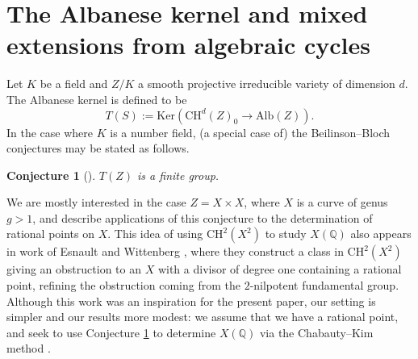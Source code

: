 \documentclass[11pt]{amsart}
\def\Q{\mathbb Q}
\theoremstyle{plain}
\newtheorem{conjecture}{Conjecture}
\theoremstyle{definition}
\newcommand{\Ker}{\mathrm{Ker}}
\newcommand{\CH}{\mathrm{CH}}
\newcommand{\Alb}{\mathrm{Alb}}
\begin{document}
\section{The Albanese kernel and mixed extensions from algebraic cycles}\label{sec:alb}
Let $K$ be a field and $Z/K$ a smooth projective irreducible variety of dimension $d$. The Albanese kernel is defined to be
\[
T(S):=\Ker (\CH^d (Z)_0 \to \Alb (Z)).
\]
In the case where $K$ is a number field, (a special case of) the Beilinson--Bloch conjectures may be stated as follows.
\begin{conjecture}[\cite{beilinson}]\label{conj:BB}
$T(Z)$ is a finite group.
\end{conjecture}

We are mostly interested in the case $Z=X\times X$, where $X$ is a curve of genus $g>1$, and describe applications of this conjecture to the determination of rational points on $X$. This idea of using $\CH ^2 (X^2 )$ to study $X(\Q )$ also appears in work of Esnault and Wittenberg \cite{EW}, where they construct a class in $\CH ^2 (X^2 )$ giving an obstruction to an $X$ with a divisor of degree one containing a rational point, refining the obstruction coming from the $2$-nilpotent fundamental group. Although this work was an inspiration for the present paper, our setting is simpler and our results more modest: we assume that we have a rational point, and seek to use Conjecture \ref{conj:BB} to determine $X(\Q )$ via the Chabauty--Kim method \cite{kim:chabauty} \cite{kim:siegel}.
\end{document}
